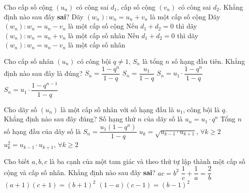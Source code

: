 \begin{ex}%
	Cho cấp số cộng $(u_n)$ có công sai $d_1$, cấp số cộng $(v_n)$ có công sai $d_2$. Khẳng định nào sau đây \textbf{sai}?	
	\choice
	{Dãy $(w_n)\colon w_n=u_n+v_n$ là một cấp số cộng}
	{Dãy $(w_n)\colon w_n=u_n-v_n$ là một cấp số cộng}
	{Nếu $d_1+d_2=0$ thì dãy $(w_n)\colon w_n=u_n+v_n$ là một cấp số nhân}
	{\True Nếu $d_1+d_2=0$ thì dãy $(w_n)\colon w_n=u_n-v_n$ là một cấp số nhân}
\end{ex}

\begin{ex}%
	Cho cấp số nhân $ \left(u_n\right) $ có công bội $ q \neq 1 $, $ S_n $ là tổng $ n $ số hạng đầu tiên. Khẳng định nào sau đây là đúng?
	\choice
	{$ S_n=\dfrac{1-q^n}{1-q} $}
	{$ S_n = \dfrac{u_1}{1-q} $}
	{\True $ S_n=u_1 \cdot \dfrac{1-q^n}{1-q} $}
	{$ S_n=u_1 \cdot \dfrac{1-q^{n-1}}{1-q} $}
\end{ex}

\begin{ex}%
	Cho dãy số $ \left(u_n\right) $	 là một cấp số nhân với số hạng đầu là $ u_1 $, công bội là $ q $. Khẳng định nào sau đây đúng?
	\choice
	{Số hạng thứ $ n $ của dãy số là $ u_n = u_1 \cdot q^{n} $}
	{Tổng $ n $ số hạng đầu của dãy số là $ S_n=\dfrac{u_1\left(1-q^n\right)}{1-q} $}
	{$ u_k =\sqrt{u_{k-1} \cdot u_{k+1}}$, $\forall k \ge 2 $}
	{\True $ u_k^2 = u_{k-1} \cdot u_{k+1}$, $\forall k \ge 2$}
\end{ex}

\begin{ex}%
	Cho biết $a,b,c$ là ba cạnh của một tam giác và theo thứ tự lập thành một cấp số cộng và cấp số nhân. Khẳng định nào sau đây \textbf{sai}?
	\choice
	{$ac=b^2$}
	{$\dfrac{1}{c}+\dfrac{1}{a}=\dfrac{2}{b}$}
	{$(a+1)(c+1)=(b+1)^2$}
	{\True $(1-a)(c-1)=(b-1)^2$}
\end{ex}

